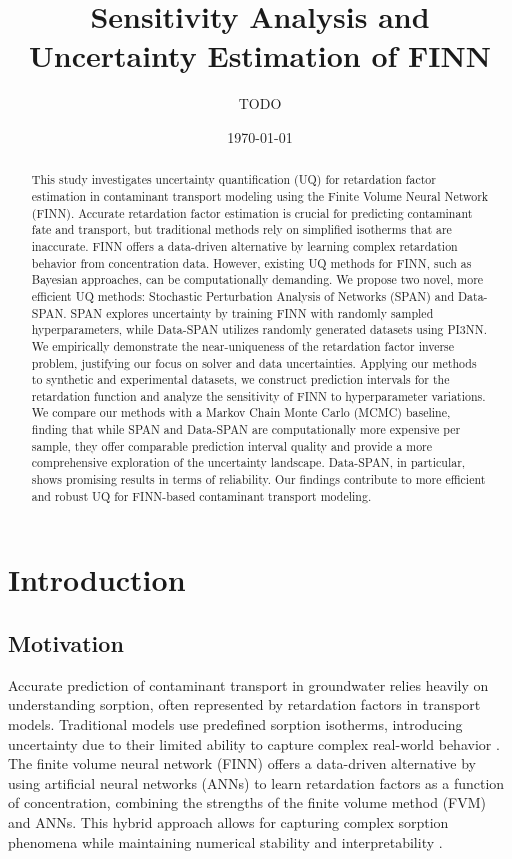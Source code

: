 \documentclass{article}
\title{Sensitivity Analysis and Uncertainty Estimation of FINN}
\author{TODO}
\date{\today}
\begin{document}
\maketitle

\begin{abstract}
This study investigates uncertainty quantification (UQ) for retardation factor estimation in contaminant transport modeling using the Finite Volume Neural Network (FINN). Accurate retardation factor estimation is crucial for predicting contaminant fate and transport, but traditional methods rely on simplified isotherms that are inaccurate. FINN offers a data-driven alternative by learning complex retardation behavior from concentration data. However, existing UQ methods for FINN, such as Bayesian approaches, can be computationally demanding. We propose two novel, more efficient UQ methods: Stochastic Perturbation Analysis of Networks (SPAN) and Data-SPAN. SPAN explores uncertainty by training FINN with randomly sampled hyperparameters, while Data-SPAN utilizes randomly generated datasets using PI3NN. We empirically demonstrate the near-uniqueness of the retardation factor inverse problem, justifying our focus on solver and data uncertainties. Applying our methods to synthetic and experimental datasets, we construct prediction intervals for the retardation function and analyze the sensitivity of FINN to hyperparameter variations. We compare our methods with a Markov Chain Monte Carlo (MCMC) baseline, finding that while SPAN and Data-SPAN are computationally more expensive per sample, they offer comparable prediction interval quality and provide a more comprehensive exploration of the uncertainty landscape. Data-SPAN, in particular, shows promising results in terms of reliability. Our findings contribute to more efficient and robust UQ for FINN-based contaminant transport modeling.
\end{abstract}

\tableofcontents

\section{Introduction}

\subsection{Motivation}
Accurate prediction of contaminant transport in groundwater relies heavily on understanding sorption, often represented by retardation factors in transport models. Traditional models use predefined sorption isotherms, introducing uncertainty due to their limited ability to capture complex real-world behavior \cite{finn}. The finite volume neural network (FINN) \cite{finn} offers a data-driven alternative by using artificial neural networks (ANNs) to learn retardation factors as a function of concentration, combining the strengths of the finite volume method (FVM) and ANNs. This hybrid approach allows for capturing complex sorption phenomena while maintaining numerical stability and interpretability \cite{finn}.
\end{document}

